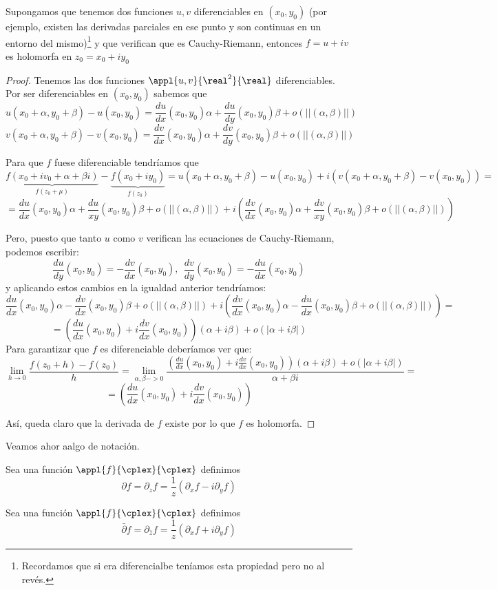 \documentclass{apuntes}
\begin{document}
\begin{prop}
Supongamos que tenemos dos funciones $u,v$ diferenciables en $(x_0,y_0)$ (por ejemplo, existen las derivadas parciales en ese punto y son continuas en un entorno del mismo)\footnote{Recordamos que si era diferencialbe teníamos esta propiedad pero no al revés.} y que verifican que es Cauchy-Riemann, entonces $f=u+iv$ es holomorfa en $z_0=x_0+iy_0$
\end{prop}
\begin{proof}
Tenemos las dos funciones $\appl{u,v}{\real^2}{\real}$ diferenciables. Por ser diferenciables en $(x_0,y_0)$ sabemos que
\[u(x_0+α,y_0+β)-u(x_0,y_0)=\frac{du}{dx}(x_0,y_0)α+\frac{du}{dy}(x_0,y_0)β + o(||(α,β)||)\]
\[v(x_0+α,y_0+β)-v(x_0,y_0)=\frac{dv}{dx}(x_0,y_0)α+\frac{dv}{dy}(x_0,y_0)β + o(||(α,β)||)\]

Para que $f$ fuese diferenciable tendríamos que
\[\underbrace{f(x_0+iv_0+α+βi)}_{f(z_0+μ)}-\underbrace{f(x_0+iy_0)}_{f(z_0)} = u(x_0+α,y_0+β)-u(x_0,y_0) + i \left( v(x_0+α,y_0+β)-v(x_0,y_0)\right) = \]
\[= \frac{du}{dx}(x_0,y_0)α+\frac{du}{xy}(x_0,y_0)β + o(||(α,β)||)+i\left( \frac{dv}{dx}(x_0,y_0)α+\frac{dv}{xy}(x_0,y_0)β + o(||(α,β)||)\right)\]

Pero, puesto que tanto $u$ como $v$ verifican las ecuaciones de Cauchy-Riemann, podemos escribir:
\[\frac{du}{dy}(x_0,y_0)=-\frac{dv}{dx}(x_0,y_0), \ \ \frac{dv}{dy}(x_0,y_0)=-\frac{du}{dx}(x_0,y_0) \]
y aplicando estos cambios en la igualdad anterior tendríamos:
\[\frac{du}{dx}(x_0,y_0)α-\frac{dv}{dx}(x_0,y_0)β + o(||(α,β)||)+i\left( \frac{dv}{dx}(x_0,y_0)α-\frac{du}{dx}(x_0,y_0)β + o(||(α,β)||)\right)=\]
\[=\left(\frac{du}{dx}(x_0,y_0)+i\frac{dv}{dx}(x_0,y_0)\right)(α+iβ)+o(|α+iβ|)\]
Para garantizar que $f$ es diferenciable deberíamos ver que:
\[\lim_{h\to 0} \frac{f(z_0+h)-f(z_0)}{h} = \lim_{α,β->0} \frac{\left(\frac{du}{dx}(x_0,y_0)+i\frac{dv}{dx}(x_0,y_0)\right)(α+iβ)+o(|α+iβ|)}{α+βi} = \]
\[= \left(\frac{du}{dx}(x_0,y_0)+i\frac{dv}{dx}(x_0,y_0)\right)\]

Así, queda claro que la derivada de $f$ existe por lo que $f$ es holomorfa.
\end{proof}

Veamos ahor aalgo de notación.
\begin{defn}
Sea una función $\appl{f}{\cplex}{\cplex}$ definimos
\[\partial f = \partial_z f = \frac{1}{z}(\partial_x f - i \partial_y f)\]
\end{defn}

\begin{defn}
Sea una función $\appl{f}{\cplex}{\cplex}$ definimos
\[\bar{\partial} f = \partial_{\bar{z}} f = \frac{1}{z}(\partial_x f + i \partial_y f)\]
\end{defn}
\end{document}
